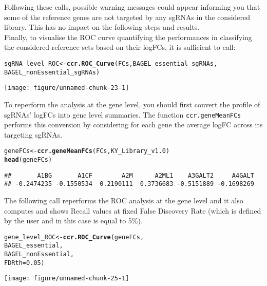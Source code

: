 \documentclass{article}\usepackage[]{graphicx}\usepackage[]{color}
\makeatletter
\def\maxwidth{ %
  \ifdim\Gin@nat@width>\linewidth
    \linewidth
  \else
    \Gin@nat@width
  \fi
}
\newcommand{\hlnum}[1]{\textcolor[rgb]{0.686,0.059,0.569}{#1}}%
\newcommand{\hlstd}[1]{\textcolor[rgb]{0.345,0.345,0.345}{#1}}%
\newcommand{\hlkwb}[1]{\textcolor[rgb]{0.69,0.353,0.396}{#1}}%
\newcommand{\hlkwc}[1]{\textcolor[rgb]{0.333,0.667,0.333}{#1}}%
\newcommand{\hlkwd}[1]{\textcolor[rgb]{0.737,0.353,0.396}{\textbf{#1}}}%
\newenvironment{kframe}{%
 \def\at@end@of@kframe{}%
 \ifinner\ifhmode%
  \def\at@end@of@kframe{\end{minipage}}%
  \begin{minipage}{\columnwidth}%
 \fi\fi%
 \def\FrameCommand##1{\hskip\@totalleftmargin \hskip-\fboxsep
 \colorbox{shadecolor}{##1}\hskip-\fboxsep
     \hskip-\linewidth \hskip-\@totalleftmargin \hskip\columnwidth}%
 \MakeFramed {\advance\hsize-\width
   \@totalleftmargin\z@ \linewidth\hsize
   \@setminipage}}%
 {\par\unskip\endMakeFramed%
 \at@end@of@kframe}
\newenvironment{knitrout}{}{} %
\makeatother
\begin{document}
Following these calls, possible warning messages could appear informing you that some of the reference genes are not targeted by any sgRNAs in the considered library. This has no impact on the following steps and results.\\

Finally, to visualise the ROC curve quantifying the performances in classifying the considered reference sets based on their logFCs, it is sufficient to call:
\begin{knitrout}
\color{fgcolor}\begin{kframe}
\begin{alltt}
\hlstd{sgRNA_level_ROC}\hlkwb{<-}\hlkwd{ccr.ROC_Curve}\hlstd{(FCs,BAGEL_essential_sgRNAs,}
                              \hlstd{BAGEL_nonEssential_sgRNAs)}
\end{alltt}
\end{kframe}
\texttt{[image: figure/unnamed-chunk-23-1]} 

\end{knitrout}
%
To reperform the analysis at the gene level, you should first convert the profile of sgRNAs' logFCs into gene level summaries. The function \texttt{ccr.geneMeanFCs} performs this conversion by considering for each gene the average logFC across its targeting sgRNAs.

\begin{knitrout}
\color{fgcolor}\begin{kframe}
\begin{alltt}
\hlstd{geneFCs}\hlkwb{<-}\hlkwd{ccr.geneMeanFCs}\hlstd{(FCs,KY_Library_v1.0)}
\hlkwd{head}\hlstd{(geneFCs)}
\end{alltt}
\begin{verbatim}
##       A1BG       A1CF        A2M      A2ML1    A3GALT2     A4GALT 
## -0.2474235 -0.1550534  0.2190111  0.3736683 -0.5151889 -0.1698269
\end{verbatim}
\end{kframe}
\end{knitrout}

The following call reperforms the ROC analysis at the gene level and it also computes and shows Recall values at fixed False Discovery Rate (which is defined by the user and in this case is equal to 5\%).

\begin{knitrout}
\color{fgcolor}\begin{kframe}
\begin{alltt}
\hlstd{gene_level_ROC}\hlkwb{<-}\hlkwd{ccr.ROC_Curve}\hlstd{(geneFCs,}
                         \hlstd{BAGEL_essential,}
                         \hlstd{BAGEL_nonEssential,}
                         \hlkwc{FDRth} \hlstd{=} \hlnum{0.05}\hlstd{)}
\end{alltt}
\end{kframe}
\texttt{[image: figure/unnamed-chunk-25-1]} 

\end{knitrout}
\end{document}
